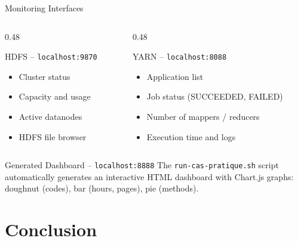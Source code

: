 \documentclass[aspectratio=169, 11pt]{beamer}
\begin{document}
\begin{frame}{Monitoring Interfaces}
  \begin{columns}[T]
    \begin{column}{0.48\textwidth}
      \begin{block}{ HDFS -- \texttt{localhost:9870}}
        \begin{itemize}
          \item Cluster status
          \item Capacity and usage
          \item Active datanodes
          \item HDFS file browser
        \end{itemize}
      \end{block}
    \end{column}
    \begin{column}{0.48\textwidth}
      \begin{block}{ YARN -- \texttt{localhost:8088}}
        \begin{itemize}
          \item Application list
          \item Job status (SUCCEEDED, FAILED)
          \item Number of mappers / reducers
          \item Execution time and logs
        \end{itemize}
      \end{block}
    \end{column}
  \end{columns}

  \vspace{1em}

  \begin{exampleblock}{ Generated Dashboard -- \texttt{localhost:8888}}
    The \texttt{run-cas-pratique.sh} script automatically generates an interactive HTML dashboard
    with Chart.js graphs: doughnut (codes), bar (hours, pages), pie (methods).
  \end{exampleblock}
\end{frame}

\section{Conclusion}
\end{document}
